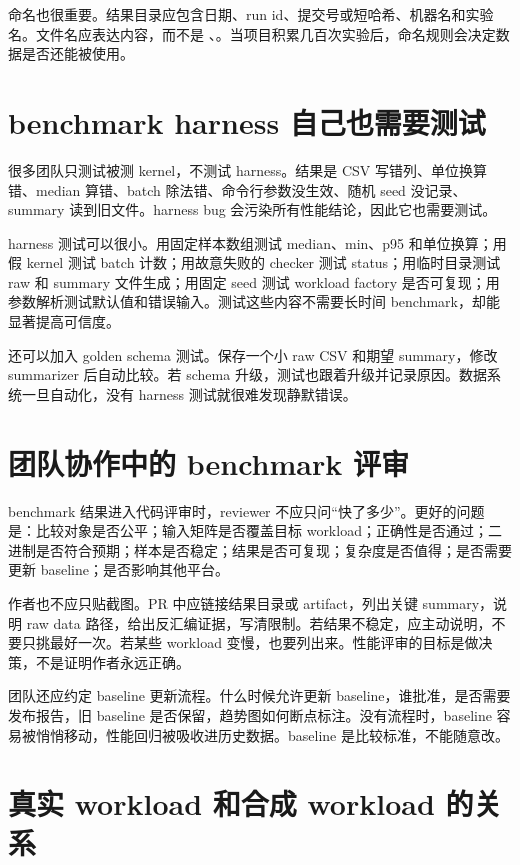 命名也很重要。结果目录应包含日期、run id、提交号或短哈希、机器名和实验名。文件名应表达内容，而不是 、。当项目积累几百次实验后，命名规则会决定数据是否还能被使用。

\section{benchmark harness 自己也需要测试}

很多团队只测试被测 kernel，不测试 harness。结果是 CSV 写错列、单位换算错、median 算错、batch 除法错、命令行参数没生效、随机 seed 没记录、summary 读到旧文件。harness bug 会污染所有性能结论，因此它也需要测试。

harness 测试可以很小。用固定样本数组测试 median、min、p95 和单位换算；用假 kernel 测试 batch 计数；用故意失败的 checker 测试 status；用临时目录测试 raw 和 summary 文件生成；用固定 seed 测试 workload factory 是否可复现；用参数解析测试默认值和错误输入。测试这些内容不需要长时间 benchmark，却能显著提高可信度。

还可以加入 golden schema 测试。保存一个小 raw CSV 和期望 summary，修改 summarizer 后自动比较。若 schema 升级，测试也跟着升级并记录原因。数据系统一旦自动化，没有 harness 测试就很难发现静默错误。

\section{团队协作中的 benchmark 评审}

benchmark 结果进入代码评审时，reviewer 不应只问“快了多少”。更好的问题是：比较对象是否公平；输入矩阵是否覆盖目标 workload；正确性是否通过；二进制是否符合预期；样本是否稳定；结果是否可复现；复杂度是否值得；是否需要更新 baseline；是否影响其他平台。

作者也不应只贴截图。PR 中应链接结果目录或 artifact，列出关键 summary，说明 raw data 路径，给出反汇编证据，写清限制。若结果不稳定，应主动说明，不要只挑最好一次。若某些 workload 变慢，也要列出来。性能评审的目标是做决策，不是证明作者永远正确。

团队还应约定 baseline 更新流程。什么时候允许更新 baseline，谁批准，是否需要发布报告，旧 baseline 是否保留，趋势图如何断点标注。没有流程时，baseline 容易被悄悄移动，性能回归被吸收进历史数据。baseline 是比较标准，不能随意改。

\section{真实 workload 和合成 workload 的关系}

